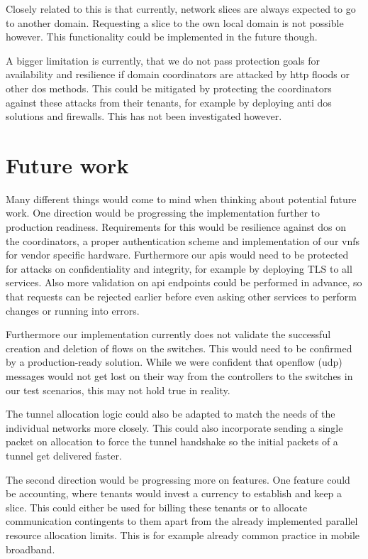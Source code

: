 Closely related to this is that currently, network slices are always expected to go to another domain. Requesting a slice to the own local domain is not possible however. This functionality could be implemented in the future though.

A bigger limitation is currently, that we do not pass protection goals for availability and resilience if domain coordinators are attacked by \acrshort{http} floods or other \acrshort{dos} methods. This could be mitigated by protecting the coordinators against these attacks from their tenants, for example by deploying anti \acrshort{dos} solutions and firewalls. This has not been investigated however.


\section{Future work}
Many different things would come to mind when thinking about potential future work. One direction would be progressing the implementation further to production readiness. Requirements for this would be resilience against \acrshort{dos} on the coordinators, a proper authentication scheme and implementation of our \acrshort{vnf}s for vendor specific hardware. Furthermore our \acrshort{api}s would need to be protected for attacks on confidentiality and integrity, for example by deploying TLS to all services. Also more validation on \acrshort{api} endpoints could be performed in advance, so that requests can be rejected earlier before even asking other services to perform changes or running into errors.

Furthermore our implementation currently does not validate the successful creation and deletion of flows on the switches. This would need to be confirmed by a production-ready solution. While we were confident that \Gls{openflow} (\acrshort{udp}) messages would not get lost on their way from the controllers to the switches in our test scenarios, this may not hold true in reality.

The tunnel allocation logic could also be adapted to match the needs of the individual networks more closely. This could also incorporate sending a single packet on allocation to force the tunnel handshake so the initial packets of a tunnel get delivered faster.

The second direction would be progressing more on features. One feature could be accounting, where tenants would invest a currency to establish and keep a slice. This could either be used for billing these tenants or to allocate communication contingents to them apart from the already implemented parallel resource allocation limits. This is for example already common practice in mobile broadband.

